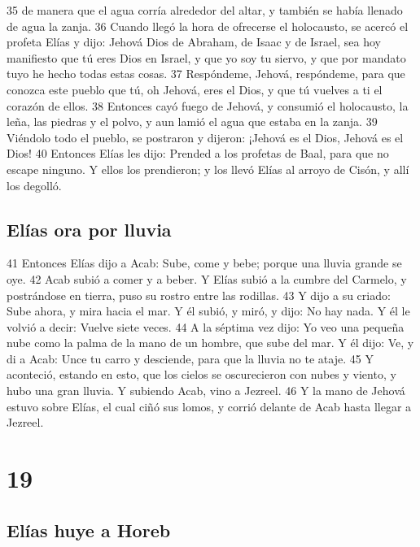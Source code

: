 35 de manera que el agua corría alrededor del altar, y también se había llenado de agua la zanja.
36 Cuando llegó la hora de ofrecerse el holocausto, se acercó el profeta Elías y dijo: Jehová Dios de Abraham, de Isaac y de Israel, sea hoy manifiesto que tú eres Dios en Israel, y que yo soy tu siervo, y que por mandato tuyo he hecho todas estas cosas.
37 Respóndeme, Jehová, respóndeme, para que conozca este pueblo que tú, oh Jehová, eres el Dios, y que tú vuelves a ti el corazón de ellos.
38 Entonces cayó fuego de Jehová, y consumió el holocausto, la leña, las piedras y el polvo, y aun lamió el agua que estaba en la zanja.
39 Viéndolo todo el pueblo, se postraron y dijeron: ¡Jehová es el Dios, Jehová es el Dios!
40 Entonces Elías les dijo: Prended a los profetas de Baal, para que no escape ninguno. Y ellos los prendieron; y los llevó Elías al arroyo de Cisón, y allí los degolló.

\section*{Elías ora por lluvia}

41 Entonces Elías dijo a Acab: Sube, come y bebe; porque una lluvia grande se oye.
42 Acab subió a comer y a beber. Y Elías subió a la cumbre del Carmelo, y postrándose en tierra, puso su rostro entre las rodillas.
43 Y dijo a su criado: Sube ahora, y mira hacia el mar. Y él subió, y miró, y dijo: No hay nada. Y él le volvió a decir: Vuelve siete veces.
44 A la séptima vez dijo: Yo veo una pequeña nube como la palma de la mano de un hombre, que sube del mar. Y él dijo: Ve, y di a Acab: Unce tu carro y desciende, para que la lluvia no te ataje.
45 Y aconteció, estando en esto, que los cielos se oscurecieron con nubes y viento, y hubo una gran lluvia. Y subiendo Acab, vino a Jezreel.
46 Y la mano de Jehová estuvo sobre Elías, el cual ciñó sus lomos, y corrió delante de Acab hasta llegar a Jezreel. 

\chapter{19}

\section*{Elías huye a Horeb}

